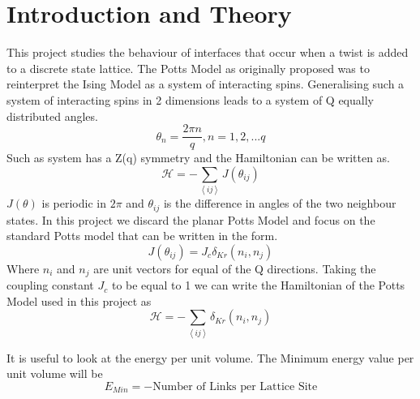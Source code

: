 \chapter{Introduction and Theory}

This project studies the behaviour of interfaces that occur when a twist is added to a discrete state lattice.
The Potts Model as originally proposed was to reinterpret the Ising Model as a system of interacting spins.
Generalising such a system of interacting spins in 2 dimensions leads to a system of Q equally distributed angles.
\begin{equation}
\theta_n=\frac{2\pi n}{q}, n=1,2,...q
\end{equation}
Such as system has a Z(q) symmetry and the Hamiltonian can be written as.
\begin{equation}
\mathcal{H}=-\sum_{\left\langle ij \right\rangle} J(\theta_{ij})
\end{equation}
$J(\theta)$ is periodic in $2\pi$ and $\theta_{ij}$ is the difference in angles of the two neighbour states.
In this project we discard the planar Potts Model and focus on the standard Potts model that can be written in the form.
\begin{equation}
J(\theta_{ij})=J_c\delta_{Kr}(n_i,n_j)
\end{equation}
Where $n_i$ and $n_j$ are unit vectors for equal of the Q directions.
Taking the coupling constant $J_c$ to be equal to 1 we can write the Hamiltonian of the Potts Model used in this project as
\begin{equation}
\mathcal{H}=-\sum_{\left\langle ij \right\rangle} \delta_{Kr}(n_i,n_j)
\end{equation}

It is useful to look at the energy per unit volume.
The Minimum energy value per unit volume will be
\begin{equation}
E_{Min} = - \textrm{Number of Links per Lattice Site}
\end{equation}


